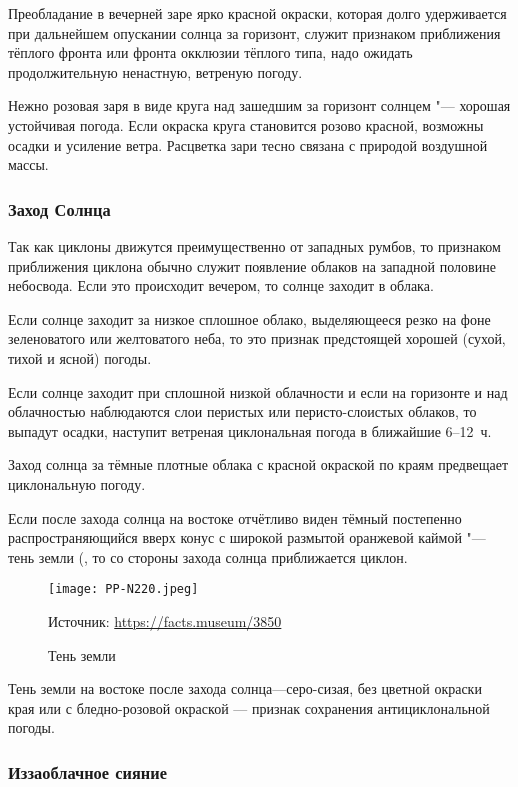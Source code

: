  Преобладание в вечерней заре ярко красной окраски, которая
долго удерживается при дальнейшем опускании солнца за горизонт, служит
признаком приближения тёплого фронта или фронта окклюзии тёплого типа,
надо ожидать продолжительную ненастную, ветреную погоду.

 Нежно розовая заря в виде круга над зашедшим за горизонт солнцем
"--- хорошая устойчивая погода. Если окраска круга становится розово
красной, возможны осадки и усиление ветра. Расцветка зари тесно
связана с природой воздушной массы.

\subsubsection{Заход Солнца}

Так как циклоны движутся преимущественно от западных румбов, то
признаком приближения циклона обычно служит появление облаков на
западной половине небосвода. Если это происходит вечером, то солнце
заходит в облака.

 Если солнце заходит за низкое сплошное облако, выделяющееся
резко на фоне зеленоватого или желтоватого неба, то это признак
предстоящей хорошей (сухой, тихой и ясной) погоды.

 Если солнце заходит при сплошной низкой облачности и если на
горизонте и над облачностью наблюдаются слои перистых или
перисто-слоистых облаков, то выпадут осадки, наступит ветреная
циклональная погода в ближайшие 6--12~ч.

 Заход солнца за тёмные плотные облака с красной окраской по
краям предвещает циклональную погоду.

 Если после захода солнца на востоке отчётливо виден тёмный
постепенно распространяющийся вверх конус с широкой размытой оранжевой
каймой "--- тень земли (, то со стороны захода солнца
приближается циклон.

\begin{figure}[htb]
  \centering{}
  \texttt{[image: PP-N220.jpeg]}
  \caption{Тень земли}
  \label{fig:pp-n220}
  \scriptsize
  \centering{}Источник: \url{https://facts.museum/3850}
\end{figure}

 Тень земли на востоке после захода солнца—серо-сизая, без цветной
окраски края или с бледно-розовой окраской — признак сохранения
антициклональной погоды.

\subsubsection{Иззаоблачное сияние}

